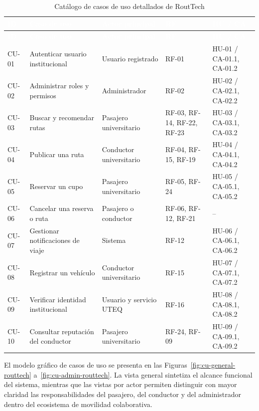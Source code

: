 \documentclass[12pt,a4paper]{article}
\begin{document}
\begin{longtable}{C{1.20cm} L{4.20cm} L{3.15cm} L{2.10cm} L{2.50cm}}
\caption{Catálogo de casos de uso detallados de RoutTech}\label{tab:catalogo-cu}\\
\textcolor{white}{\textbf{ID}} &
\textcolor{white}{\textbf{Caso de uso}} &
\textcolor{white}{\textbf{Actor principal}} &
\textcolor{white}{\textbf{RF}} &
\textcolor{white}{\textbf{HU / CA}}\\
\endfirsthead
{}
\textcolor{white}{\textbf{ID}} &
\textcolor{white}{\textbf{Caso de uso}} &
\textcolor{white}{\textbf{Actor principal}} &
\textcolor{white}{\textbf{RF}} &
\textcolor{white}{\textbf{HU / CA}}\\
\endhead
CU-01 & Autenticar usuario institucional & Usuario registrado & RF-01 & HU-01 / CA-01.1, CA-01.2\\
CU-02 & Administrar roles y permisos & Administrador & RF-02 & HU-02 / CA-02.1, CA-02.2\\
CU-03 & Buscar y recomendar rutas & Pasajero universitario & RF-03, RF-14, RF-22, RF-23 & HU-03 / CA-03.1, CA-03.2\\
CU-04 & Publicar una ruta & Conductor universitario & RF-04, RF-15, RF-19 & HU-04 / CA-04.1, CA-04.2\\
CU-05 & Reservar un cupo & Pasajero universitario & RF-05, RF-24 & HU-05 / CA-05.1, CA-05.2\\
CU-06 & Cancelar una reserva o ruta & Pasajero o conductor & RF-06, RF-12, RF-21 & --\\
CU-07 & Gestionar notificaciones de viaje & Sistema & RF-12 & HU-06 / CA-06.1, CA-06.2\\
CU-08 & Registrar un vehículo & Conductor universitario & RF-15 & HU-07 / CA-07.1, CA-07.2\\
CU-09 & Verificar identidad institucional & Usuario y servicio UTEQ & RF-16 & HU-08 / CA-08.1, CA-08.2\\
CU-10 & Consultar reputación del conductor & Pasajero universitario & RF-24, RF-09 & HU-09 / CA-09.1, CA-09.2\\
\end{longtable}


El modelo gráfico de casos de uso se presenta en las Figuras~\ref{fig:cu-general-routtech} a~\ref{fig:cu-admin-routtech}. La vista general sintetiza el alcance funcional del sistema, mientras que las vistas por actor permiten distinguir con mayor claridad las responsabilidades del pasajero, del conductor y del administrador dentro del ecosistema de movilidad colaborativa.
\end{document}
